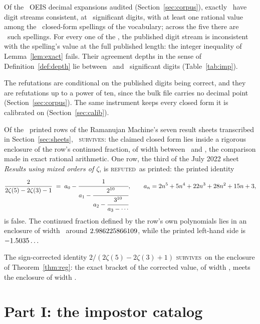 \documentclass[11pt]{article}
\theoremstyle{definition}
\theoremstyle{plain}
\newcommand{\vS}{\textsc{survives}}
\newcommand{\vR}{\textsc{refuted}}
\begin{document}
\begin{theorem}\label{thm:imp}
Of the \OeisAudited\ OEIS decimal expansions audited (Section~\ref{sec:corpus}), exactly \ImpConstants\ have digit streams consistent, at \ScreenDigits\ significant digits, with at least one rational value among the \FormsTested\ closed-form spellings of the vocabulary; across the five there are \ImpCount\ such spellings. For every one of the \ImpCount, the published digit stream is inconsistent with the spelling's value at the full published length: the integer inequality of Lemma~\ref{lem:exact} fails. Their agreement depths in the sense of Definition~\ref{def:depth} lie between \ImpShallowest\ and \ImpDeepest\ significant digits (Table~\ref{tab:imp}).
\end{theorem}

The refutations are conditional on the published digits being correct, and they are refutations up to a power of ten, since the bulk file carries no decimal point (Section~\ref{sec:corpus}). The same instrument keeps every closed form it is calibrated on (Section~\ref{sec:calib}).

\begin{theorem}\label{thm:reg}
Of the \RmPrinted\ printed rows of the Ramanujan Machine's seven result sheets transcribed in Section~\ref{sec:sheets}, \RmSurvive\ \vS: the claimed closed form lies inside a rigorous enclosure of the row's continued fraction, of width between \RmNarrowest\ and \RmWidest, the comparison made in exact rational arithmetic. One row, the third of the July 2022 sheet \emph{Results using mixed orders of $\zeta$}, is \vR\ as printed: the printed identity
\[
\frac{2}{2\zeta(5)-2\zeta(3)-1}\;=\;a_0-\cfrac{1}{a_1-\cfrac{2^{10}}{a_2-\cfrac{3^{10}}{a_3-\cdots}}},\qquad a_n=2n^{5}+5n^{4}+22n^{3}+28n^{2}+15n+3,
\]
is false. The continued fraction defined by the row's own polynomials lies in an enclosure of width \RowThreeWidth\ around $2.986225866109$, while the printed left-hand side is $-1.5035\ldots$
\end{theorem}

\begin{proposition}\label{prop:corr}
The sign-corrected identity $2/(2\zeta(5)-2\zeta(3)+1)$ \vS\ on the enclosure of Theorem~\ref{thm:reg}: the exact bracket of the corrected value, of width \RowThreeCorrFormWidth, meets the enclosure of width \RowThreeWidth.
\end{proposition}

\section{Part I: the impostor catalog}
\end{document}
